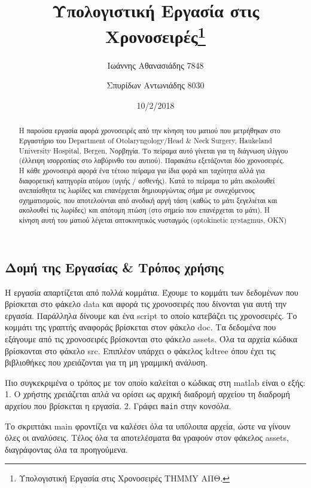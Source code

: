 \documentclass[11pt,]{article}
\title{Υπολογιστική Εργασία στις Χρονοσειρές\thanks{Υπολογιστική Εργασία στις Χρονοσειρές THMMY ΑΠΘ.}}
\author{Ιωάννης Αθανασιάδης 7848 \and Σπυρίδων Αντωνιάδης 8030}
\date{10/2/2018}
\begin{document}
\maketitle
\begin{abstract}
Η παρούσα εργασία αφορά χρονοσειρές από την κίνηση του ματιού που
μετρήθηκαν στο Εργαστήριο του Department of Otolaryngology/Head \& Neck
Surgery, Haukeland University Hospital, Bergen, Νορβηγία. Το πείραμα
αυτό γίνεται για τη διάγνωση ιλίγγου (έλλειψη ισορροπίας στο λαβύρινθο
του αυτιού). Παρακάτω εξετάζονται δύο χρονοσειρές. Η κάθε χρονοσειρά
αφορά ένα τέτοιο πείραμα για ίδια φορά και ταχύτητα αλλά για διαφορετική
κατηγορία ατόμου (υγιής / ασθενής). Κατά το πείραμα το μάτι ακολουθεί
ανεπαίσθητα τις λωρίδες και επανέρχεται δημιουργώντας σήμα με
συνεχόμενους σχηματισμούς, που αποτελούνται από ανοδική αργή τάση (καθώς
το μάτι ξεγελιέται και ακολουθεί τις λωρίδες) και απότομη πτώση (στο
σημείο που επανέρχεται το μάτι). Η κίνηση αυτή του ματιού λέγεται
οπτοκινητικός νυσταγμός (optokinetic nystagmus, OKN)
\end{abstract}

\hypertarget{ux3b4ux3bfux3bcux3ae-ux3c4ux3b7ux3c2-ux3b5ux3c1ux3b3ux3b1ux3c3ux3afux3b1ux3c2-ux3c4ux3c1ux3ccux3c0ux3bfux3c2-ux3c7ux3c1ux3aeux3c3ux3b7ux3c2}{%
\subsection{Δομή της Εργασίας \& Τρόπος
χρήσης}\label{ux3b4ux3bfux3bcux3ae-ux3c4ux3b7ux3c2-ux3b5ux3c1ux3b3ux3b1ux3c3ux3afux3b1ux3c2-ux3c4ux3c1ux3ccux3c0ux3bfux3c2-ux3c7ux3c1ux3aeux3c3ux3b7ux3c2}}

Η εργασία απαρτίζεται από πολλά κομμάτια. Έχουμε το κομμάτι των
δεδομένων που βρίσκεται στο φάκελο data και αφορά τις χρονοσειρές που
δίνονται για αυτή την εργασία. Παράλληλα δίνουμε και ένα script το οποίο
κατεβάζει τις χρονοσειρές. Το κομμάτι της γραπτής αναφοράς βρίσκεται
στον φάκελο doc. Τα δεδομένα που εξάγουμε από τις χρονοσειρές βρίσκονται
στο φάκελο assets. Όλα τα αρχεία κώδικα βρίσκονται στο φάκελο src.
Επιπλέον υπάρχει ο φάκελος kdtree όπου έχει τις βιβλιοθήκες που
χρειάζονται για τη μη γραμμική ανάλυση.

Πιο συγκεκριμένα ο τρόπος με τον οποίο καλείται ο κώδικας στη matlab
είναι ο εξής: 1. Ο χρήστης χρειάζεται απλά να ορίσει ως αρχική διαδρομή
αρχείου τη διαδρομή αρχείου που βρίσκεται η εργασία. 2. Γράφει
\texttt{main} στην κονσόλα.

Το σκριπτάκι main φροντίζει να καλέσει όλα τα υπόλοιπα αρχεία, ώστε να
γίνουν όλες οι αναλύσεις. Τέλος όλα τα αποτελέσματα θα γραφούν στον
φάκελος assets, διαγράφοντας όλα τα προηγούμενα.
\end{document}

